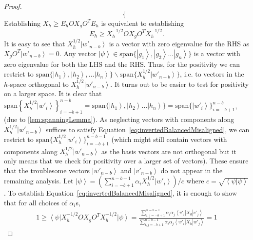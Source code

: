 \documentclass{article}
\begin{document}
\begin{proof}
\begin{displaymath}
\begin{cases}
    \end{cases}
  \end{displaymath}
  Establishing $X_{h}\ge E_{h}OX_{g}O^{T}E_{h}$ is equivalent
  to establishing
  \begin{equation}
    E_{h}\ge X_{h}^{-1/2}OX_{g}O^{T}X_{h}^{-1/2}.\label{eq:invertedBalancedMisaligned}
  \end{equation}
  It is easy to see that $X_{h}^{1/2}\left|w'_{n-b}\right\rangle $
  is a vector with zero eigenvalue for the RHS as $X_{g}O^{T}\left|w'_{n-b}\right\rangle =0$.
  Any vector $\left|\psi\right\rangle \in\text{span}\{\left|g_{1}\right\rangle ,\left|g_{2}\right\rangle \dots\left|g_{n}\right\rangle \}$
  is a vector with zero eigenvalue for both the LHS and the RHS. Thus, for
  the positivity we can restrict to $\text{span}\{\left|h_{1}\right\rangle ,\left|h_{2}\right\rangle ,\dots\left|h_{n}\right\rangle \}\backslash\text{span}\{X_{h}^{1/2}\left|w'_{n-b}\right\rangle \}$,
  i.e. to vectors in the $h$-space orthogonal to $X_{h}^{1/2}\left|w'_{n-b}\right\rangle $.
  It turns out to be easier to test for positivity on a larger
  space. It is clear that $\text{span}\left\{ X_{h}^{1/2}\left|w'_{i}\right\rangle \right\} _{i=-b+1}^{n-b}=\text{span}\{\left|h_{1}\right\rangle ,\left|h_{2}\right\rangle \dots\left|h_{n}\right\rangle \}=\text{span}\{\left|w' _{i}\right\rangle\}_{i=-b+1}^{n-b}$,
  (due to \cref{lem:spanningLemma}). As neglecting vectors with components
  along $X_{h}^{1/2}\left|w'_{n-b}\right\rangle $ suffices to satisfy Equation~\eqref{eq:invertedBalancedMisaligned}, we can restrict
  to $\text{span}\{X_{h}^{1/2}\left|w'_{i}\right\rangle \}_{i=-b+1}^{n-b-1}$
  (which might still contain vectors with components along $X_{h}^{1/2}\left|w'_{n-b}\right\rangle $
  as the basis vectors are not orthogonal but it only means that we
  check for positivity over a larger set of vectors). These ensure that
  the troublesome vectors  $\left|w'_{n-b}\right\rangle $ and
  $\left|v'_{n-b}\right\rangle $ do not appear in the remaining analysis.
  Let $\left|\psi\right\rangle =\left(\sum_{i=-b+1}^{n-b-1}\alpha_{i}X_{h}^{1/2}\left|w'_{i}\right\rangle \right)/c$
  where $c=\sqrt{\left\langle \psi|\psi\right\rangle }$. To establish
  Equation~\eqref{eq:invertedBalancedMisaligned}, it is enough to show that for
  all choices of $\alpha_{i}$s,
  \begin{align}
    1  \ge\left\langle \psi\right|X_{h}^{-1/2}OX_{g}O^{T}X_{h}^{-1/2}\left|\psi\right\rangle
    =\frac{\sum_{i,j=-b+1}^{n-b-1}\alpha_{i}\alpha_{j}\left\langle v'_{i}\right|X_{g}\left|v'_{j}\right\rangle }{\sum_{i,j=-b+1}^{n-b-1}\alpha_{i}\alpha_{j}\left\langle w'_{i}\right|X_{h}\left|w'_{j}\right\rangle } =1 \label{eq:ratioForInequality}

\end{align}
\end{proof}
\end{document}
